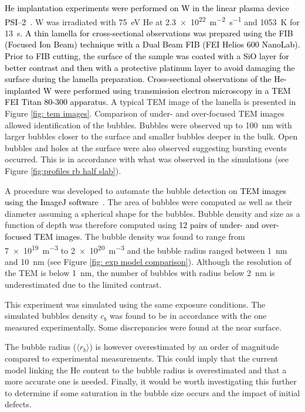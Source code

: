 \textcolor{black}{He implantation experiments were performed on W in the linear plasma device PSI--2~}.
W was irradiated with \SI{75}{eV} He at \SI{2.3e22}{m^{-2}.s^{-1}} and \SI{1053}{K} for \SI{13}{s}.
\textcolor{black}{
A thin lamella for cross-sectional observations was prepared using the FIB (Focused Ion Beam) technique with a Dual Beam FIB (FEI Helios 600 NanoLab).
Prior to FIB cutting, the surface of the sample was coated with a SiO layer for better contrast and then with a protective platinum layer to avoid damaging the surface during the lamella preparation.
Cross-sectional observations of the He-implanted W were performed using transmission electron microscopy in a TEM FEI Titan 80-300 apparatus.
}
A typical TEM image of the lamella is presented in Figure \ref{fig: tem images}.
Comparison of under- and over-focused TEM images allowed identification of the bubbles.
Bubbles were observed up to \SI{100}{nm} with larger bubbles closer to the surface and smaller bubbles deeper in the bulk.
Open bubbles and holes at the surface were also observed suggesting bursting events occurred.
This is in accordance with what was observed in the simulations (see Figure \ref{fig:profiles rb half slab}).

A procedure was developed to automate the bubble detection on \textcolor{black}{TEM images using the ImageJ software~}.
The area of bubbles were computed as well as their diameter assuming a spherical shape for the bubbles.
Bubble density and size as a function of depth was therefore computed using \textcolor{black}{12 pairs of under- and over-focused TEM images}.
The bubble density was found to range from \SI{7e19}{m^{-3}} to \SI{2e20}{m^{-3}} and the bubble radius ranged between \SI{1}{nm} and \SI{10}{nm} (see Figure \ref{fig: exp model comparison}).
Although the resolution of the TEM is below \SI{1}{nm}, the number of bubbles with radius below \SI{2}{nm} is underestimated due to the limited contrast.

This experiment was simulated using the same exposure conditions.
The simulated bubbles density $c_b$ was found to be in accordance with the one measured experimentally.
Some discrepancies were found at the near surface.

The bubble radius ($\langle r_b \rangle$) is however overestimated by an order of magnitude compared to experimental measurements.
This could imply that the current model linking the He content to the bubble radius is overestimated and that a more accurate one is needed.
Finally, it would be worth investigating this further to determine if some saturation in the bubble size occurs and the impact of initial defects.


